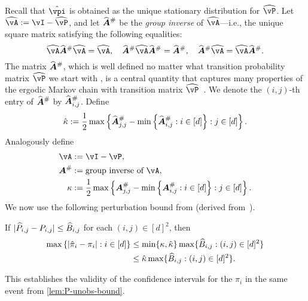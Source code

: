 Recall that $\hat\vpi$ is obtained as the unique stationary
distribution for $\wh\vP$.
Let $\wh\vA := \vI - \wh\vP$, and let $\giAh$ be the \emph{group
inverse} of $\wh\vA$---i.e., the unique square matrix satisfying the
following equalities:
\[
  \wh\vA\giAh\wh\vA = \wh\vA , \quad
  \giAh\wh\vA\giAh = \giAh , \quad
  \giAh\wh\vA = \wh\vA\giAh .
\]
The matrix $\giAh$, which is well defined no matter what transition probability matrix $\wh\vP$ we start with
\citep{meyer1975role},
 is a central quantity that captures many properties
of the ergodic Markov chain with transition matrix
$\wh\vP$~\citep{meyer1975role}.
We denote the $(i,j)$-th entry of $\giAh$ by $\giAh_{i,j}$.
Define
\begin{equation}
  \hat\kappa :=
  \frac12
  \max
  \Braces{
    \giAh_{j,j}
    - \min\Braces{ \giAh_{i,j} : i \in [d] }
    : j \in [d]
  }
  .
  \notag
\end{equation}
Analogously define
\begin{align*}
  \vA & := \vI - \vP , \\
  \giA & := \text{group inverse of $\vA$} , \\
  \kappa & :=
  \frac12
  \max
  \Braces{
    \giA_{j,j}
    - \min\Braces{ \giA_{i,j} : i \in [d] }
    : j \in [d]
  }
  .
\end{align*}
We now use the following perturbation bound from \citep[Section
3.3]{cho2001comparison} (derived
from~\citet{haviv1984perturbation,kirkland1998applications}).
\begin{lemma}
  \label{lem:pi-perturb}
  If
  $|\widehat{P}_{i,j} - P_{i,j}| \leq \widehat{B}_{i,j}$ for each $(i,j) \in
  [d]^2$, then
  \begin{align}
    \max\left\{
      |\hat\pi_i - \pi_i|
      : i \in [d]
    \right\}
    & \leq \min\{\kappa,\hat\kappa\} \max
    \{
      \widehat{B}_{i,j}
      : (i,j) \in [d]^2
    \}
    \notag \\
    & \leq \hat\kappa \max
    \{
      \widehat{B}_{i,j}
      : (i,j) \in [d]^2
    \}
    .
    \notag
  \end{align}
\end{lemma}
This establishes the validity of the confidence intervals for the
$\pi_i$ in the same event from \cref{lem:P-unobs-bound}.

